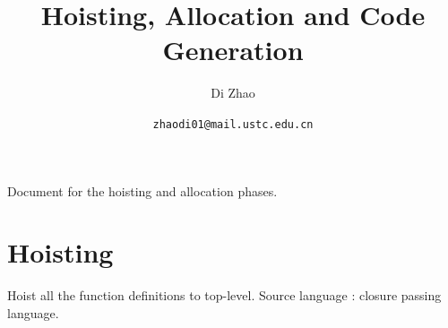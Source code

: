 \documentclass{article}
\theoremstyle{definition}
\theoremstyle{remark}
\numberwithin{equation}{section}
\begin{document}
\newcommand{\env}[1]{[\![#1]\!]\kappa}
\newcommand{\round}[1]{(\!|#1|\!)}

\title{Hoisting, Allocation and Code Generation}%
\author{Di Zhao}%
\date{\small{\texttt{zhaodi01@mail.ustc.edu.cn}}}%

\maketitle

Document for the hoisting and allocation phases.

\section{Hoisting}

Hoist all the function definitions
to top-level. Source language : closure passing language.
\end{document}

